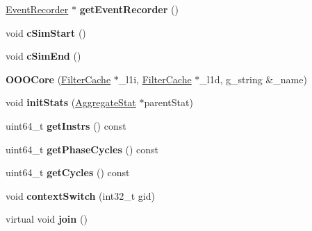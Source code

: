 \begin{DoxyCompactItemize}
\item 
\hypertarget{classOOOCore_ab70925f444691d37172dd593df14d7de}{\hyperlink{classEventRecorder}{Event\-Recorder} $\ast$ {\bfseries get\-Event\-Recorder} ()}\label{classOOOCore_ab70925f444691d37172dd593df14d7de}

\item 
\hypertarget{classOOOCore_a005b405bed0f1f23b419be5cdff68736}{void {\bfseries c\-Sim\-Start} ()}\label{classOOOCore_a005b405bed0f1f23b419be5cdff68736}

\item 
\hypertarget{classOOOCore_a7aee253f36e45cf018589efa8e2c98b2}{void {\bfseries c\-Sim\-End} ()}\label{classOOOCore_a7aee253f36e45cf018589efa8e2c98b2}

\item 
\hypertarget{classOOOCore_a8e128fbcf5d1aad568c32303dc45ddd0}{{\bfseries O\-O\-O\-Core} (\hyperlink{classFilterCache}{Filter\-Cache} $\ast$\-\_\-l1i, \hyperlink{classFilterCache}{Filter\-Cache} $\ast$\-\_\-l1d, g\-\_\-string \&\-\_\-name)}\label{classOOOCore_a8e128fbcf5d1aad568c32303dc45ddd0}

\item 
\hypertarget{classOOOCore_a82046d72c1e1e24434dd388f7b5d945c}{void {\bfseries init\-Stats} (\hyperlink{classAggregateStat}{Aggregate\-Stat} $\ast$parent\-Stat)}\label{classOOOCore_a82046d72c1e1e24434dd388f7b5d945c}

\item 
\hypertarget{classOOOCore_a0f799816e26c267127b0a7f2e295921e}{uint64\-\_\-t {\bfseries get\-Instrs} () const }\label{classOOOCore_a0f799816e26c267127b0a7f2e295921e}

\item 
\hypertarget{classOOOCore_a62014c3805f0a2520474e2f0de8d8afb}{uint64\-\_\-t {\bfseries get\-Phase\-Cycles} () const }\label{classOOOCore_a62014c3805f0a2520474e2f0de8d8afb}

\item 
\hypertarget{classOOOCore_a5b527137a0b02e16bd3b8a1c0f38f985}{uint64\-\_\-t {\bfseries get\-Cycles} () const }\label{classOOOCore_a5b527137a0b02e16bd3b8a1c0f38f985}

\item 
\hypertarget{classOOOCore_a396ab9ae4b9e60827474fa0983919146}{void {\bfseries context\-Switch} (int32\-\_\-t gid)}\label{classOOOCore_a396ab9ae4b9e60827474fa0983919146}

\item 
\hypertarget{classOOOCore_a22b4a79fde9a4e168f25bf2bcb10bf89}{virtual void {\bfseries join} ()}\label{classOOOCore_a22b4a79fde9a4e168f25bf2bcb10bf89}


\end{DoxyCompactItemize}
